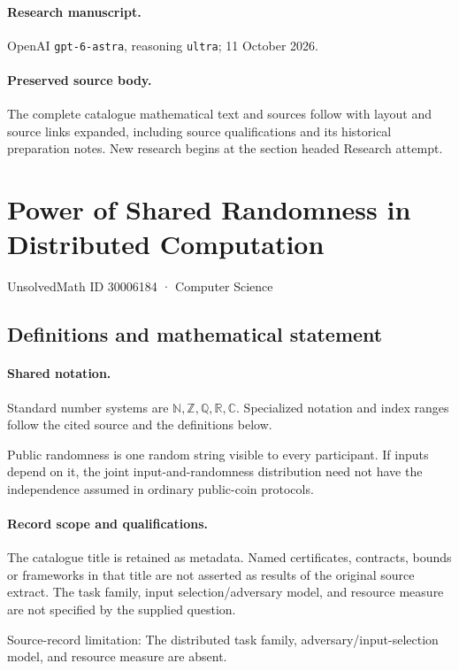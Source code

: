 \documentclass[11pt]{article}
\begin{document}
\paragraph{Research manuscript.} OpenAI \texttt{gpt-6-astra}, reasoning \texttt{ultra}; 11 October 2026.
\paragraph{Preserved source body.} The complete catalogue mathematical text and sources follow with layout and source links expanded, including source qualifications and its historical preparation notes. New research begins at the section headed Research attempt.

\section{Power of Shared Randomness in Distributed Computation}\label{30006184}
{\small UnsolvedMath ID 30006184 · Computer Science}
\subsection{Definitions and mathematical statement}

\paragraph{Shared notation.}Standard number systems are $\mathbb N,\mathbb Z,\mathbb Q,\mathbb R,\mathbb C$. Specialized notation and index ranges follow the cited source and the definitions below.


Public randomness is one random string visible to every participant. If inputs depend on it, the joint input-and-randomness distribution need not have the independence assumed in ordinary public-coin protocols.
\paragraph{Record scope and qualifications.}
The catalogue title is retained as metadata. Named certificates, contracts, bounds or frameworks in that title are not asserted as results of the original source extract.
The task family, input selection/adversary model, and resource measure are not specified by the supplied question.

Source-record limitation: The distributed task family, adversary/input-selection model, and resource measure are absent.
\end{document}

